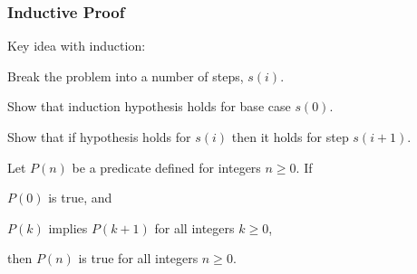 \subsubsection{Inductive Proof}

Key idea with induction:

\begin{listu}
    \item Break the problem into a number of steps, $s(i)$. 
    \item Show that induction hypothesis holds for base case $s(0)$. 
    \item Show that if hypothesis holds for $s(i)$ then it holds for step $s(i+1)$.
\end{listu}

\begin{theorem}
    Let $P(n)$ be a predicate defined for integers $n \geq 0$. If
    \begin{listo}
        \item $P(0)$ is true, and
        \item $P(k)$ implies $P(k+1)$ for all integers $k \geq 0$,
    \end{listo}
    then $P(n)$ is true for all integers $n \geq 0$.
\end{theorem}

